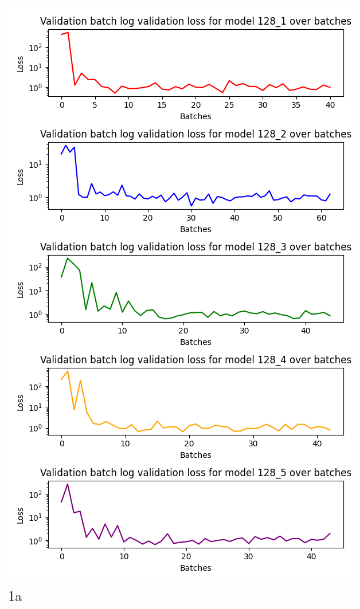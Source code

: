 \begin{figure}[H]
    \caption{Plots of training loss for individual models in the ensembles of 64-state- and 128-state- representations.}
    \begin{subfigure}{0.5\textwidth}
        \centering
        \includegraphics[width=0.95\linewidth]{Images/Results/Validation_loss_128.png}
        \caption{1a}
        \label{fig:v-loss-128}
    \end{subfigure}%
    \begin{subfigure}{0.5\textwidth}
        \centering

\end{subfigure}
\end{figure}
